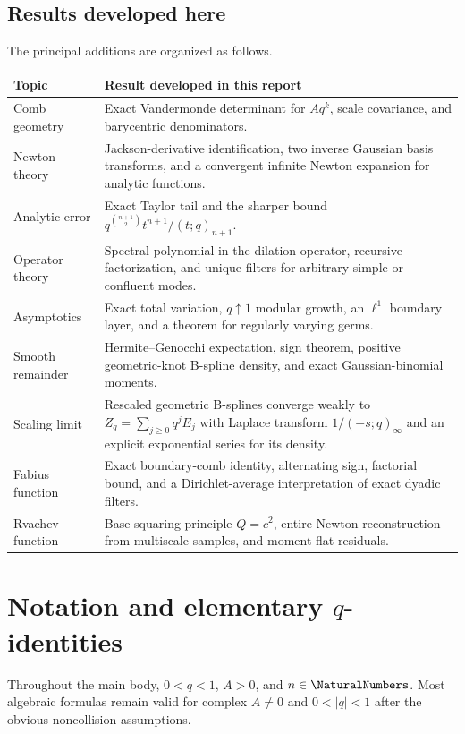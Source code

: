 \documentclass[11pt,oneside]{article}
\numberwithin{equation}{section}
\theoremstyle{definition}
\theoremstyle{remark}
\begin{document}
\subsection{Results developed here}

The principal additions are organized as follows.
\begin{longtable}{p{}p{}}
\toprule
Topic & Result developed in this report\\
\midrule
\endhead
Comb geometry & Exact Vandermonde determinant for $Aq^k$, scale covariance,
and barycentric denominators.\\
Newton theory & Jackson-derivative identification, two inverse Gaussian basis
transforms, and a convergent infinite Newton expansion for analytic functions.\\
Analytic error & Exact Taylor tail and the sharper bound
$q^{\binom{n+1}{2}}t^{n+1}/(t;q)_{n+1}$.\\
Operator theory & Spectral polynomial in the dilation operator, recursive
factorization, and unique filters for arbitrary simple or confluent modes.\\
Asymptotics & Exact total variation, $q\uparrow1$ modular growth, an $\ell^1$
boundary layer, and a theorem for regularly varying germs.\\
Smooth remainder & Hermite--Genocchi expectation, sign theorem, positive
geometric-knot B-spline density, and exact Gaussian-binomial moments.\\
Scaling limit & Rescaled geometric B-splines converge weakly to
$Z_q=\sum_{j\ge0}q^jE_j$ with Laplace transform $1/(-s;q)_\infty$ and an
explicit exponential series for its density.\\
Fabius function & Exact boundary-comb identity, alternating sign, factorial
bound, and a Dirichlet-average interpretation of exact dyadic filters.\\
Rvachev function & Base-squaring principle $Q=c^2$, entire Newton
reconstruction from multiscale samples, and moment-flat residuals.\\
\bottomrule
\end{longtable}

\section{Notation and elementary $q$-identities}

Throughout the main body, $0<q<1$, $A>0$, and $n\in\NaturalNumbers$.  Most algebraic
formulas remain valid for complex $A\ne0$ and $0<|q|<1$ after the obvious
noncollision assumptions.
\end{document}
